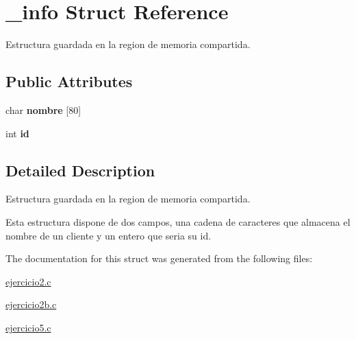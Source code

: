 \hypertarget{struct__info}{\section{\-\_\-info Struct Reference}
\label{struct__info}
}


Estructura guardada en la region de memoria compartida.  


\subsection*{Public Attributes}
\begin{DoxyCompactItemize}
\item 
\hypertarget{struct__info_ab2c335f775d180811caa4b464f321f87}{char {\bfseries nombre} \mbox{[}80\mbox{]}}\label{struct__info_ab2c335f775d180811caa4b464f321f87}

\item 
\hypertarget{struct__info_aad251c67a1f0bce28b975a9d36fc0f4a}{int {\bfseries id}}\label{struct__info_aad251c67a1f0bce28b975a9d36fc0f4a}

\end{DoxyCompactItemize}


\subsection{Detailed Description}
Estructura guardada en la region de memoria compartida. 

Esta estructura dispone de dos campos, una cadena de caracteres que almacena el nombre de un cliente y un entero que seria su id. 

The documentation for this struct was generated from the following files\-:\begin{DoxyCompactItemize}
\item 
\hyperlink{ejercicio2_8c}{ejercicio2.\-c}\item 
\hyperlink{ejercicio2b_8c}{ejercicio2b.\-c}\item 
\hyperlink{ejercicio5_8c}{ejercicio5.\-c}\end{DoxyCompactItemize}
